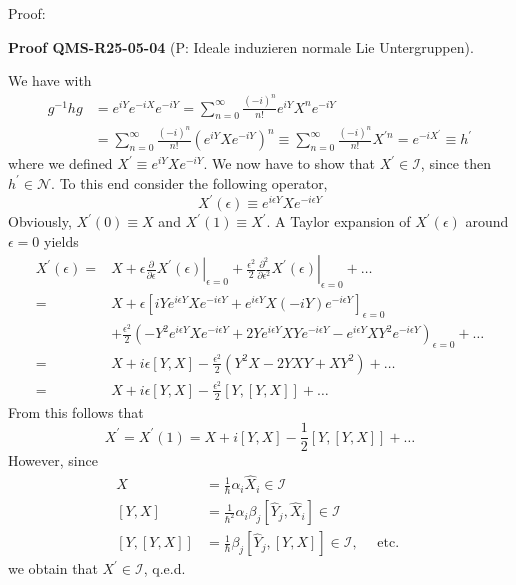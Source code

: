 \documentclass[10pt, letterpaper]{article}
\newcommand{\CustomHeading}[3]{%
  \par\medskip\noindent%
  \textbf{#1 #2} \textnormal{(#3)}.\enskip%
}
\newenvironment{PROOF}[2]{\begin{unitbox}\CustomHeading{Proof}{#1}{#2}}{\end{unitbox}}
\begin{document}
Proof: 


\begin{PROOF}{QMS-R25-05-04}{P: Ideale induzieren normale Lie Untergruppen}
We have with
$$
\begin{aligned}
g^{-1} h g & =e^{i Y} e^{-i X} e^{-i Y}=\sum_{n=0}^{\infty} \frac{(-i)^{n}}{n!} e^{i Y} X^{n} e^{-i Y} \\
& =\sum_{n=0}^{\infty} \frac{(-i)^{n}}{n!}\left(e^{i Y} X e^{-i Y}\right)^{n} \equiv \sum_{n=0}^{\infty} \frac{(-i)^{n}}{n!} X^{\prime n}=e^{-i X^{\prime}} \equiv h^{\prime}
\end{aligned}
$$
where we defined $X^{\prime} \equiv e^{i Y} X e^{-i Y}$. We now have to show that $X^{\prime} \in \mathcal{I}$, since then $h^{\prime} \in \mathcal{N}$. To this end consider the following operator,
$$
X^{\prime}(\epsilon) \equiv e^{i \epsilon Y} X e^{-i \epsilon Y}
$$
Obviously, $X^{\prime}(0) \equiv X$ and $X^{\prime}(1) \equiv X^{\prime}$. A Taylor expansion of $X^{\prime}(\epsilon)$ around $\epsilon=0$ yields
$$
\begin{aligned}
X^{\prime}(\epsilon)= & X+\left.\epsilon \frac{\partial}{\partial \epsilon} X^{\prime}(\epsilon)\right|_{\epsilon=0}+\left.\frac{\epsilon^{2}}{2} \frac{\partial^{2}}{\partial \epsilon^{2}} X^{\prime}(\epsilon)\right|_{\epsilon=0}+\ldots \\
= & X+\epsilon\left[i Y e^{i \epsilon Y} X e^{-i \epsilon Y}+e^{i \epsilon Y} X(-i Y) e^{-i \epsilon Y}\right]_{\epsilon=0} \\
& +\frac{\epsilon^{2}}{2}\left(-Y^{2} e^{i \epsilon Y} X e^{-i \epsilon Y}+2 Y e^{i \epsilon Y} X Y e^{-i \epsilon Y}-e^{i \epsilon Y} X Y^{2} e^{-i \epsilon Y}\right)_{\epsilon=0}+\ldots \\
= & X+i \epsilon[Y, X]-\frac{\epsilon^{2}}{2}\left(Y^{2} X-2 Y X Y+X Y^{2}\right)+\ldots \\
= & X+i \epsilon[Y, X]-\frac{\epsilon^{2}}{2}[Y,[Y, X]]+\ldots
\end{aligned}
$$
From this follows that
$$
X^{\prime}=X^{\prime}(1)=X+i[Y, X]-\frac{1}{2}[Y,[Y, X]]+\ldots
$$
However, since
$$
\begin{aligned}
X & =\frac{1}{\hbar} \alpha_{i} \hat{X}_{i} \in \mathcal{I} \\
{[Y, X] } & =\frac{1}{\hbar^{2}} \alpha_{i} \beta_{j}\left[\hat{Y}_{j}, \hat{X}_{i}\right] \in \mathcal{I} \\
{[Y,[Y, X]] } & =\frac{1}{\hbar} \beta_{j}\left[\hat{Y}_{j},[Y, X]\right] \in \mathcal{I}, \quad \text { etc. }
\end{aligned}
$$
we obtain that $X^{\prime} \in \mathcal{I}$, q.e.d.
\end{PROOF}
\end{document}
